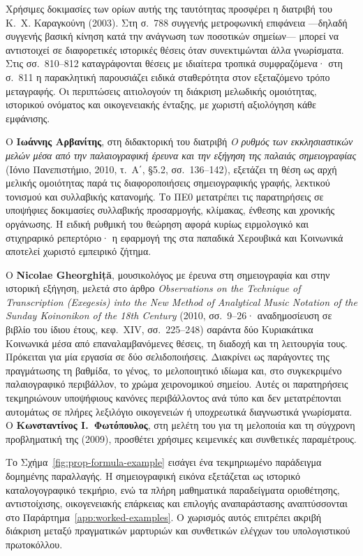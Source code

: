 \documentclass[11pt,a4paper]{article}
\begin{document}
Χρήσιμες δοκιμασίες των ορίων αυτής της ταυτότητας προσφέρει η διατριβή του Κ.~Χ. Καραγκούνη (2003). Στη σ.~788 συγγενής μετροφωνική επιφάνεια ---δηλαδή συγγενής βασική κίνηση κατά την ανάγνωση των ποσοτικών σημείων--- μπορεί να αντιστοιχεί σε διαφορετικές ιστορικές θέσεις όταν συνεκτιμώνται άλλα γνωρίσματα. Στις σσ.~810--812 καταγράφονται θέσεις με ιδιαίτερα τροπικά συμφραζόμενα· στη σ.~811 η παρακλητική παρουσιάζει ειδικά σταθερότητα στον εξεταζόμενο τρόπο μεταγραφής. Οι περιπτώσεις αιτιολογούν τη διάκριση μελωδικής ομοιότητας, ιστορικού ονόματος και οικογενειακής ένταξης, με χωριστή αξιολόγηση κάθε εμφάνισης.

Ο \textbf{Ιωάννης Αρβανίτης}, στη διδακτορική του διατριβή \emph{Ο ρυθμός των εκκλησιαστικών μελών μέσα από την παλαιογραφική έρευνα και την εξήγηση της παλαιάς σημειογραφίας} (Ιόνιο Πανεπιστήμιο, 2010, τ.~Α΄, §5.2, σσ.~136--142), εξετάζει τη θέση ως αρχή μελικής ομοιότητας παρά τις διαφοροποιήσεις σημειογραφικής γραφής, λεκτικού τονισμού και συλλαβικής κατανομής. Το ΠΕ0 μετατρέπει τις παρατηρήσεις σε υποψήφιες δοκιμασίες συλλαβικής προσαρμογής, κλίμακας, ένθεσης και χρονικής οργάνωσης. Η ειδική ρυθμική του θεώρηση αφορά κυρίως ειρμολογικό και στιχηραρικό ρεπερτόριο· η εφαρμογή της στα παπαδικά Χερουβικά και Κοινωνικά αποτελεί χωριστό εμπειρικό ζήτημα.

Ο \textbf{Nicolae Gheorghiță}, μουσικολόγος με έρευνα στη σημειογραφία και στην ιστορική εξήγηση, μελετά στο άρθρο \emph{Observations on the Technique of Transcription (Exegesis) into the New Method of Analytical Music Notation of the Sunday Koinonikon of the 18th Century} (2010, σσ.~9--26· αναδημοσίευση σε βιβλίο του ίδιου έτους, κεφ.~XIV, σσ.~225--248) σαράντα δύο Κυριακάτικα Κοινωνικά μέσα από επαναλαμβανόμενες θέσεις, τη διαδοχή και τη λειτουργία τους. Πρόκειται για μία εργασία σε δύο σελιδοποιήσεις. Διακρίνει ως παράγοντες της πραγμάτωσης τη βαθμίδα, το γένος, το μελοποιητικό ιδίωμα και, στο συγκεκριμένο παλαιογραφικό περιβάλλον, το χρώμα χειρονομικού σημείου. Αυτές οι παρατηρήσεις τεκμηριώνουν υποψήφιους κανόνες περιβάλλοντος ανά τύπο και δεν μετατρέπονται αυτομάτως σε πλήρες λεξιλόγιο οικογενειών ή υποχρεωτικά διαγνωστικά γνωρίσματα. Ο \textbf{Κωνσταντίνος Ι.~Φωτόπουλος}, στη μελέτη του για τη μελοποιία και τη σύγχρονη προβληματική της (2009), προσθέτει χρήσιμες κειμενικές και συνθετικές παραμέτρους.

Το Σχήμα~\ref{fig:prop-formula-example} εισάγει ένα τεκμηριωμένο παράδειγμα δομημένης παραλλαγής. Η σημειογραφική εικόνα εξετάζεται ως ιστορικό καταλογογραφικό τεκμήριο, ενώ τα πλήρη μαθηματικά παραδείγματα οριοθέτησης, αντιστοίχισης, οικογενειακής επάρκειας και επιλογής αναπαράστασης αναπτύσσονται στο Παράρτημα~\ref{app:worked-examples}. Ο χωρισμός αυτός επιτρέπει ακριβή διάκριση μεταξύ πραγματικών μαρτυριών και συνθετικών ελέγχων του υπολογιστικού πρωτοκόλλου.
\end{document}
